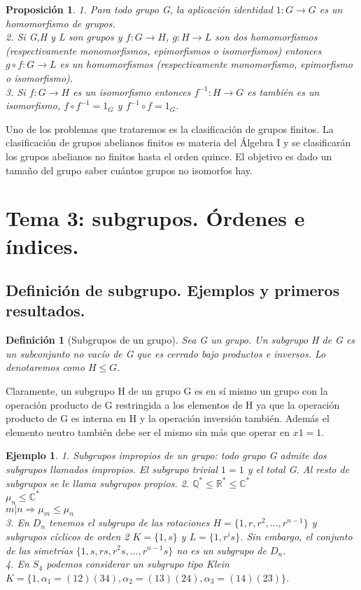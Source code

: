 \documentclass{article}
\theoremstyle{theorem-style}  %
\newtheorem{proposition}[theorem]{Proposición}
\theoremstyle{definition-style}
\newtheorem{definition}{Definición}[section]
\theoremstyle{example-style}
\newtheorem{example}{Ejemplo}[section]
\begin{document}
\begin{proposition}
1. Para todo grupo G, la aplicación identidad $1:G \rightarrow G$ es un homomorfismo de grupos. \\
2. Si G,H y L son grupos y $f:G \rightarrow H$, $g:H \rightarrow L$ son dos homomorfismos (respectivamente monomorfismos, epimorfismos o isomorfismos) entonces $g \circ f:G \rightarrow L$ es un homomorfismos (respectivamente monomorfismo, epimorfismo o isomorfismo). \\
3. Si $f:G \rightarrow H$ es un isomorfismo entonces $f^{-1}:H \rightarrow G$ es también es un isomorfismo, $f \circ f^{-1} = 1_G$ y  $f^{-1} \circ f = 1_G$.
\end{proposition}

Uno de los problemas que trataremos es la clasificación de grupos finitos. La clasificación de grupos abelianos finitos es materia del Álgebra I y se clasificarán los grupos abelianos no finitos hasta el orden quince. El objetivo es dado un tamaño del grupo saber cuántos grupos no isomorfos hay.

\newpage

\section{Tema 3: subgrupos. Órdenes e índices.}

\subsection{Definición de subgrupo. Ejemplos y primeros resultados.}

\begin{definition}[Subgrupos de un grupo]
Sea G un grupo. Un subgrupo H de G es un subconjunto no vacío de G que es cerrado bajo productos e inversos. Lo denotaremos como $H \le G$.
\end{definition}

Claramente, un subgrupo H de un grupo G es en sí mismo un grupo con la operación producto de G restringida a los elementos de H ya que la operación producto de G es interna en H y la operación inversión también. Además el elemento neutro también debe ser el mismo sin más que operar en $x 1 = 1$.

\begin{example}
1. Subgrupos impropios de un grupo: todo grupo G admite dos subgrupos llamados impropios. El subgrupo trivial $1 = {1}$ y el total G. Al resto de subgrupos se le llama subgrupos propios.
2. $\mathbb{Q}^{*} \le \mathbb{R}^{*} \le \mathbb{C}^{*}$\\
$\mu_n \le \mathbb{C}^{*}$\\
$m|n \Rightarrow \mu_m \le \mu_n$\\
3. En $D_n$ tenemos el subgrupo de las rotaciones $H = \{1,r,r^2,...,r^{n-1}\}$ y subgrupos cíclicos de orden 2 $K = \{1,s\}$ y $L = \{1,r^is\}$. Sin embargo, el conjunto de las simetrías $\{1,s,rs,r^2s,...,r^{n-1}s\}$ no es un subgrupo de $D_n$.\\
4. En $S_4$ podemos considerar un subgrupo tipo Klein $K = \{1,\alpha_1 = (12)(34),\alpha_2=(13)(24),\alpha_3=(14)(23)\}$.
\end{example}
\end{document}

